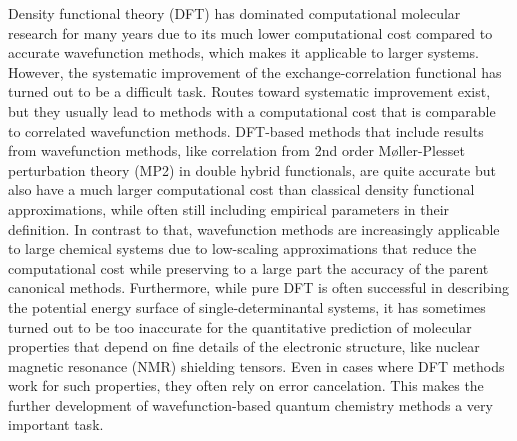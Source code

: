 Density functional theory (DFT) has dominated computational molecular research for many years due to its much lower computational cost compared to accurate wavefunction methods, which makes it applicable to larger systems. However, the systematic improvement of the exchange-correlation functional has turned out to be a difficult task. Routes toward systematic improvement exist,\cite{BleizHG_2013_84113, ErharBG_2016_143002, ThierSG_2019_144117} but they usually lead to methods with a computational cost that is comparable to correlated wavefunction methods. DFT-based methods that include results from wavefunction methods, like correlation from 2nd order Møller-Plesset perturbation theory (MP2) in double hybrid functionals,\cite{Grimm_2006_34108, GoeriG_2014_576} are quite accurate but also have a much larger computational cost than classical density functional approximations, while often still including empirical parameters in their definition. In contrast to that, wavefunction methods are increasingly applicable to large chemical systems due to low-scaling approximations that reduce the computational cost while preserving to a large part the accuracy of the parent canonical methods.\cite{PinskRVN_2015_34108, RipliPBVN_2016_24109, GuoSVN_2016_94111, SaitoBRVN_2017_164105, MaganDN_2018_1215} Furthermore, while pure DFT is often successful in describing the potential energy surface of single-determinantal systems, it has sometimes turned out to be too inaccurate for the quantitative prediction of molecular properties that depend on fine details of the electronic structure, like nuclear magnetic resonance (NMR) shielding tensors.\cite{StoycAIN_2018_619} Even in cases where DFT methods work for such properties, they often rely on error cancelation. This makes the further development of wavefunction-based quantum chemistry methods a very important task.

